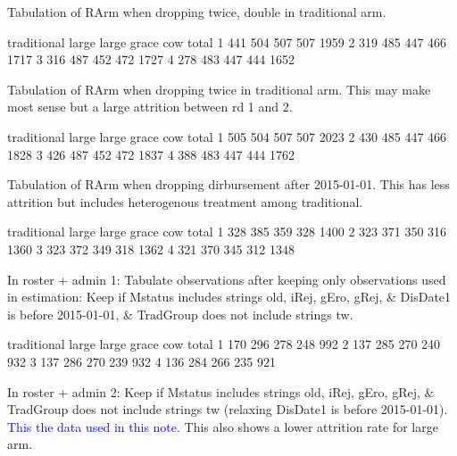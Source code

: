 Tabulation of \textsf{RArm} when dropping \textsf{twice, double} in traditional arm.
\begin{Schunk}
\begin{Soutput}
  traditional large large grace cow total
1         441   504         507 507  1959
2         319   485         447 466  1717
3         316   487         452 472  1727
4         278   483         447 444  1652
\end{Soutput}
\end{Schunk}
Tabulation of \textsf{RArm} when dropping \textsf{twice} in traditional arm. This may make most sense but a large attrition between rd 1 and 2.
\begin{Schunk}
\begin{Soutput}
  traditional large large grace cow total
1         505   504         507 507  2023
2         430   485         447 466  1828
3         426   487         452 472  1837
4         388   483         447 444  1762
\end{Soutput}
\end{Schunk}
Tabulation of \textsf{RArm} when dropping dirbursement after 2015-01-01. This has less attrition but includes heterogenous treatment among traditional.
\begin{Schunk}
\begin{Soutput}
  traditional large large grace cow total
1         328   385         359 328  1400
2         323   371         350 316  1360
3         323   372         349 318  1362
4         321   370         345 312  1348
\end{Soutput}
\end{Schunk}
In \textsf{roster + admin} 1: Tabulate observations after keeping only observations used in estimation: Keep if \textsf{Mstatus} includes strings old, iRej, gEro, gRej, \& \textsf{DisDate1} is before 2015-01-01, \& \textsf{TradGroup} does not include strings tw.
\begin{Schunk}
\begin{Soutput}
  traditional large large grace cow total
1         170   296         278 248   992
2         137   285         270 240   932
3         137   286         270 239   932
4         136   284         266 235   921
\end{Soutput}
\end{Schunk}
In \textsf{roster + admin} 2: Keep if \textsf{Mstatus} includes strings old, iRej, gEro, gRej, \& \textsf{TradGroup} does not include strings tw (relaxing  \textsf{DisDate1} is before 2015-01-01). \textcolor{blue}{This the data used in this note.} This also shows a lower attrition rate for \textsf{large} arm. \gobblepars

